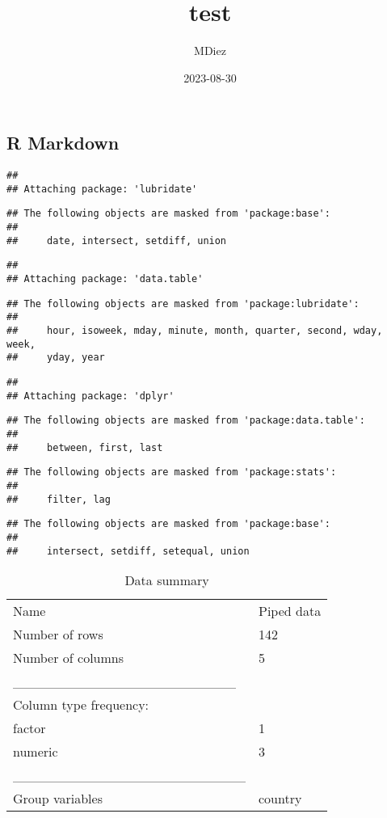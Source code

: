 \documentclass[
]{article}
\title{test}
\author{MDiez}
\date{2023-08-30}
\begin{document}
\maketitle

\hypertarget{r-markdown}{%
\subsection{R Markdown}\label{r-markdown}}

\begin{verbatim}
## 
## Attaching package: 'lubridate'
\end{verbatim}

\begin{verbatim}
## The following objects are masked from 'package:base':
## 
##     date, intersect, setdiff, union
\end{verbatim}

\begin{verbatim}
## 
## Attaching package: 'data.table'
\end{verbatim}

\begin{verbatim}
## The following objects are masked from 'package:lubridate':
## 
##     hour, isoweek, mday, minute, month, quarter, second, wday, week,
##     yday, year
\end{verbatim}

\begin{verbatim}
## 
## Attaching package: 'dplyr'
\end{verbatim}

\begin{verbatim}
## The following objects are masked from 'package:data.table':
## 
##     between, first, last
\end{verbatim}

\begin{verbatim}
## The following objects are masked from 'package:stats':
## 
##     filter, lag
\end{verbatim}

\begin{verbatim}
## The following objects are masked from 'package:base':
## 
##     intersect, setdiff, setequal, union
\end{verbatim}

\begin{longtable}[]{@{}ll@{}}
\caption{Data summary}\tabularnewline
\toprule()
\endhead
Name & Piped data \\
Number of rows & 142 \\
Number of columns & 5 \\
\_\_\_\_\_\_\_\_\_\_\_\_\_\_\_\_\_\_\_\_\_\_\_ & \\
Column type frequency: & \\
factor & 1 \\
numeric & 3 \\
\_\_\_\_\_\_\_\_\_\_\_\_\_\_\_\_\_\_\_\_\_\_\_\_ & \\
Group variables & country \\
\bottomrule()
\end{longtable}
\end{document}
